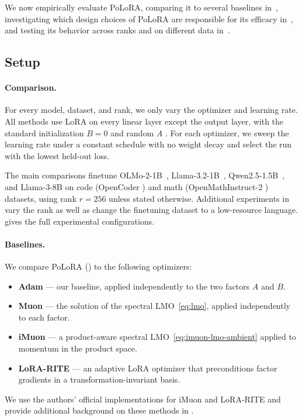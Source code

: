 \documentclass[11pt]{article}
\newcommand{\methodname}{PoLoRA\xspace}
\theoremstyle{plain}
\theoremstyle{definition}
\theoremstyle{remark}
\theoremstyle{definition}
\begin{document}
We now empirically evaluate \methodname{}, comparing it to several baselines in~, investigating which design choices of \methodname{} are responsible for its efficacy in~, and testing its behavior across ranks and on different data in~.

\subsection{Setup}
\label{sec:exp-setup}

\paragraph{Comparison.}
For every model, dataset, and rank, we only vary the optimizer and learning rate. All methods use LoRA on every linear layer except the output layer, with the standard initialization $B=0$ and random $A$ \cite{lora}. For each optimizer, we sweep the learning rate under a constant schedule with no weight decay and select the run with the lowest held-out loss.

The main comparisons finetune OLMo-2-1B~\cite{olmo2}, Llama-3.2-1B~\cite{llama3}, Qwen2.5-1.5B~\cite{qwen25}, and Llama-3-8B on code (OpenCoder \cite{opencoder}) and math (OpenMathInstruct-2 \cite{openmathinstruct2}) datasets, using rank $r=256$ unless stated otherwise. Additional experiments in  vary the rank as well as change the finetuning dataset to a low-resource language.  gives the full experimental configurations.

\paragraph{Baselines.} We compare \methodname{} () to the following optimizers:
\begin{itemize}[leftmargin=1.5em,itemsep=1pt,topsep=2pt]
  \item \textbf{Adam} \cite{adam} --- our baseline, applied independently to the two factors $A$ and $B$.
  \item \textbf{Muon} \cite{muon} --- the solution of the spectral LMO~\eqref{eq:lmo}, applied independently to each factor.
  \item \textbf{iMuon} \cite{imuon} --- a product-aware spectral LMO~\eqref{eq:imuon-lmo-ambient} applied to momentum in the product space.
  \item \textbf{LoRA-RITE} \cite{lorarite} --- an adaptive LoRA optimizer that preconditions factor gradients in a transformation-invariant basis.
\end{itemize}
We use the authors' official implementations for iMuon and LoRA-RITE and provide additional background on these methods in . 
\end{document}
